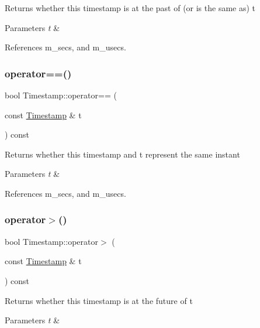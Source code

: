 Returns whether this timestamp is at the past of (or is the same as) t 
\begin{DoxyParams}{Parameters}
{\em t} & \\
\hline
\end{DoxyParams}


References m\+\_\+secs, and m\+\_\+usecs.

\mbox{\label{classDUtils_1_1Timestamp_a42280e1193a6af2ac41362cf18a1185c}} 
\subsubsection{\texorpdfstring{operator==()}{operator==()}}
{\footnotesize\ttfamily bool Timestamp\+::operator== (\begin{DoxyParamCaption}\item[{const \hyperlink{classDUtils_1_1Timestamp}{Timestamp} \&}]{t }\end{DoxyParamCaption}) const}

Returns whether this timestamp and t represent the same instant 
\begin{DoxyParams}{Parameters}
{\em t} & \\
\hline
\end{DoxyParams}


References m\+\_\+secs, and m\+\_\+usecs.

\mbox{\label{classDUtils_1_1Timestamp_ad77ef43cab29f8f588bd47d74c1a8cce}} 
\subsubsection{\texorpdfstring{operator$>$()}{operator>()}}
{\footnotesize\ttfamily bool Timestamp\+::operator$>$ (\begin{DoxyParamCaption}\item[{const \hyperlink{classDUtils_1_1Timestamp}{Timestamp} \&}]{t }\end{DoxyParamCaption}) const}

Returns whether this timestamp is at the future of t 
\begin{DoxyParams}{Parameters}
{\em t} & \\
\hline
\end{DoxyParams}


